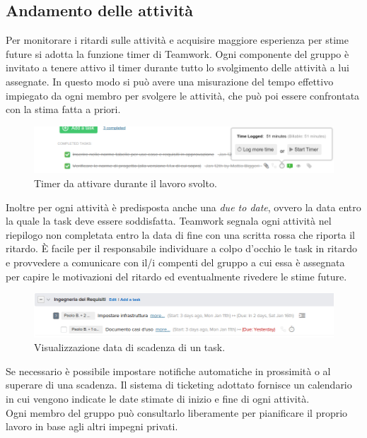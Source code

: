 \documentclass[a4paper]{report}
\begin{document}
			\subsection{Andamento delle attività}
				Per monitorare i ritardi sulle attività e acquisire maggiore esperienza per stime future si adotta la 
				funzione timer di Teamwork. Ogni componente del gruppo è invitato a tenere attivo il timer durante 
				tutto lo svolgimento delle attività a lui assegnate. In questo modo si può avere una misurazione del 
				tempo effettivo impiegato da ogni membro per svolgere le attività, che può poi essere confrontata con 
				la stima fatta a priori.
				\begin{figure}[H]
					\centering
					\includegraphics[scale=0.4]{teamworkTimer}
					\caption{Timer da attivare durante il lavoro svolto.}
				\end{figure}
				Inoltre per ogni attività è predisposta anche una \emph{due to date}, ovvero la data entro la quale la task deve 
				essere soddisfatta. Teamwork segnala ogni attività nel riepilogo non completata entro la data di fine con 
				una scritta rossa che riporta il ritardo. È facile per il responsabile individuare a colpo d'occhio le 
				task in ritardo e provvedere a comunicare con il/i compenti del gruppo a cui essa è assegnata per capire 
				le motivazioni del ritardo ed eventualmente rivedere le stime future.
				\begin{figure}[H]
					\centering
					\includegraphics[scale=0.4]{teamworkTaskinRitardo}
					\caption{Visualizzazione data di scadenza di un task.}
				\end{figure}
				Se necessario è possibile impostare notifiche automatiche in prossimità o al superare di una scadenza.
				Il sistema di ticketing adottato fornisce un calendario in cui vengono indicate le date stimate di inizio e fine
				di ogni attività.\\
				Ogni membro del gruppo può consultarlo liberamente per pianificare il proprio lavoro in base agli altri
				impegni privati.
				
\end{document}
